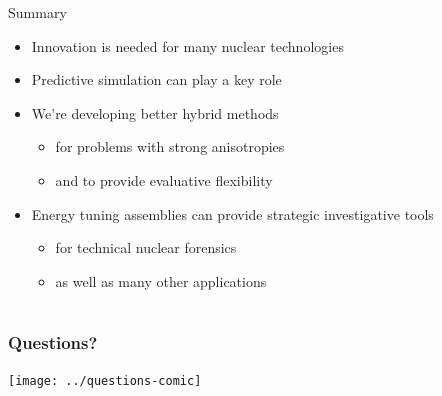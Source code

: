 \documentclass[xcolor=x11names,compress,handout]{beamer}
\renewcommand{\(}{\begin{columns}}
\renewcommand{\)}{\end{columns}}
\newcommand{\<}[1]{\begin{column}{#1}}
\renewcommand{\>}{\end{column}}
\begin{document}
\begin{frame}{Summary}
  \begin{itemize}
    \item Innovation is needed for many nuclear technologies \newline
    \item Predictive simulation can play a key role \newline
    \item We're developing better hybrid methods 
    \begin{itemize}
      \item for problems with strong anisotropies
      \item and to provide evaluative flexibility \newline
    \end{itemize}
    \item Energy tuning assemblies can provide strategic investigative tools
    \begin{itemize}
      \item for technical nuclear forensics
      \item as well as many other applications
    \end{itemize}
      
  \end{itemize}
\end{frame}

\section*{}
\begin{frame}[fragile]
  \frametitle{Questions?}
  \begin{center}
  \texttt{[image: ../questions-comic]}  
  \end{center}
  
\end{frame}
\end{document}
